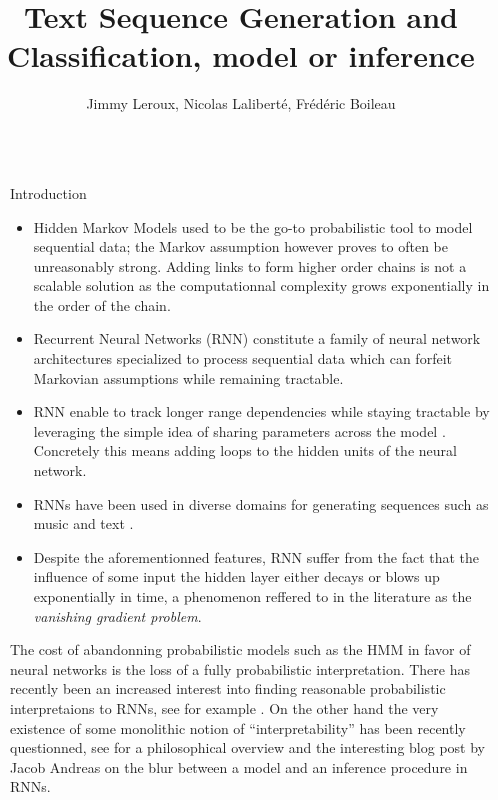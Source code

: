 \documentclass[final]{beamer}
\title{Text Sequence Generation and Classification, model or inference}
\author{Jimmy Leroux, Nicolas Laliberté, Frédéric Boileau}
\institute[]{Départment d'Informatique et de Recherche Opérationnelle -
Université de Montréal}
\newlength{\sepwidth}
\newlength{\colwidth}
\newcommand{\separatorcolumn}{\begin{column}{\sepwidth}\end{column}}
\begin{document}
\begin{frame}[t]
\begin{columns}[t]
\separatorcolumn

\begin{column}{\colwidth}

\begin{block}{Introduction}
\begin{itemize}
\item Hidden Markov Models used to be the go-to probabilistic tool to model 
sequential data; the Markov assumption however proves to often be unreasonably
strong. Adding links to form higher order chains is not a scalable solution as
the computationnal complexity grows exponentially in the order of the chain.

\item Recurrent Neural Networks (RNN) constitute a family of neural network
architectures specialized to process sequential data which can forfeit
Markovian assumptions while remaining tractable.


\item RNN enable to track longer range dependencies while staying tractable by
    leveraging the simple idea of sharing parameters across the model
    \cite{deeplearning}. Concretely this means adding loops to the hidden units
    of the neural network.

\item RNNs have been used in diverse domains for
  generating sequences such as music and text \cite{gravesGenerating}. 

\item Despite the aforementionned features, RNN suffer from the fact 
that the influence of some input the hidden layer either decays or blows up
exponentially in time, a phenomenon reffered to in the literature as the
\textit{vanishing gradient problem}.
\end{itemize}
The cost of abandonning probabilistic models such as the HMM in favor of neural
networks is the loss of a fully probabilistic interpretation. There has
recently been an increased interest into finding reasonable probabilistic
interpretaions to RNNs, see for example \cite{finnish}. On the other hand the
very existence of some monolithic notion of ``interpretability'' has been
recently questionned, see \cite{mythos} for a philosophical overview and the
interesting blog post by Jacob Andreas on the blur between a model and an
inference procedure in RNNs.\cite{monference}
\end{block}


\end{column}
\end{columns}
\end{frame}
\end{document}
